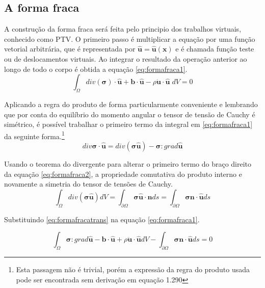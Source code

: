 \subsection{A forma fraca}
A construção da forma fraca será feita pelo principio dos trabalhos virtuais, conhecido como PTV. O primeiro passo é multiplicar a equação por uma função vetorial arbitrária, que é representada por $ \boldsymbol{\hat{u}} = \boldsymbol{\hat{u}}(\boldsymbol{x})  $ e é chamada função teste ou de deslocamentos virtuais. Ao integrar o resultado da operação anterior ao longo de todo o corpo é obtida a equação \ref{eq:formafraca1}.
\begin{equation}
\int_{\Omega} div(\boldsymbol{\sigma}) \cdot \boldsymbol{\hat{u}} + \boldsymbol{b} \cdot \boldsymbol{\hat{u}} - \rho\ddot{\boldsymbol{u}} \cdot \boldsymbol{\hat{u}} \; dV = 0
\label{eq:formafraca1}
\end{equation}

Aplicando a regra do produto de forma particularmente conveniente e lembrando que por conta do equilíbrio do momento angular o tensor de tensão de Cauchy é simétrico, é possível trabalhar o primeiro termo da integral em \ref{eq:formafraca1} da seguinte forma.\footnote{Esta passagem não é trivial, porém a expressão da regra do produto usada pode ser encontrada sem derivação em \cite{Holzapfel} equação 1.290}
\begin{equation}
	div \boldsymbol{\sigma} \cdot \boldsymbol{\hat{u}} = div(\boldsymbol{\sigma}\boldsymbol{\hat{u}}) - \boldsymbol{\sigma} : grad \boldsymbol{\hat{u}}
	\label{eq:formafraca2}
\end{equation}

Usando o teorema do divergente para alterar o primeiro termo do braço direito da equação \ref{eq:formafraca2}, a propriedade comutativa do produto interno e novamente a simetria do tensor de tensões de Cauchy.
\begin{equation} \label{eq:formafracatrans}
	\int_{\Omega} div(\boldsymbol{\sigma \hat{u}}) dV = \int_{\partial \Omega} \boldsymbol{\sigma \hat{u}} \cdot \boldsymbol{n} ds = \int_{\partial \Omega} \boldsymbol{\sigma n} \cdot \boldsymbol{\hat{u}} ds
\end{equation}

Substituindo \ref{eq:formafracatrans} na equação \ref{eq:formafraca1}.

\begin{equation}
\int_{\Omega} \boldsymbol{\sigma} : grad \boldsymbol{\hat{u}} -  \boldsymbol{b} \cdot \boldsymbol{\hat{u}} + \rho\ddot{\boldsymbol{u}} \cdot \boldsymbol{\hat{u}} dV - \int_{\partial \Omega} \boldsymbol{\sigma n} \cdot \boldsymbol{\hat{u}} ds = 0
\label{eq:formafraca3}
\end{equation}

